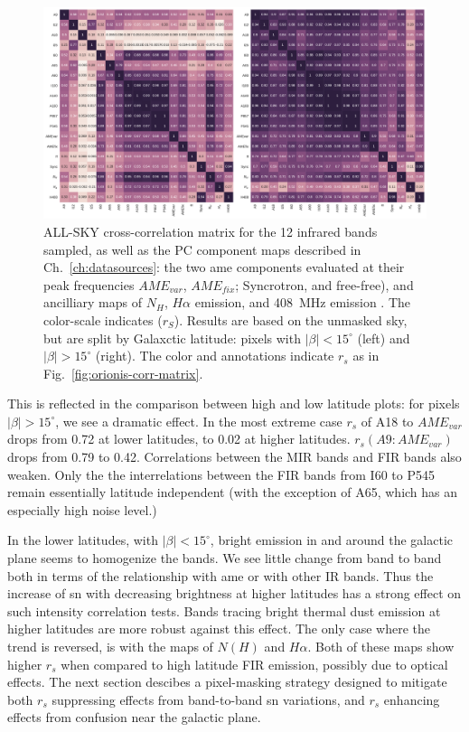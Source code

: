           \begin{figure}
            \includegraphics[width=\textwidth]{../Plots/ch_allsky/all_bands_corr_matrix_wAME_spearmanintensity_unmasked.pdf}
            \centering
            \caption{ALL-SKY cross-correlation matrix for the 12 infrared bands sampled, as well as the PC component maps described in Ch.~\ref{ch:datasources}: the two \acrshort{ame} components evaluated at their peak frequencies $AME_{var}$, $AME_{fix}$; Syncrotron, and free-free), and ancilliary maps of $N_{H}$, $H{\alpha}$ emission, and 408~MHz emission \cite{haslam82}. The color-scale indicates ($r_{S}$). Results are based on the unmasked sky, but are split by Galaxctic latitude: pixels with $|\beta{}| < 15^{\circ}$ (left) and $|\beta{}| > 15^{\circ}$ (right). The color and annotations indicate $r_{s}$ as in Fig.~\ref{fig:orionis-corr-matrix}. }
            \label{fig:all_bands_corr_matrix_wAME_spearman}
          \end{figure}
       This is reflected in the comparison between high and low latitude plots: for pixels $|\beta| > 15 ^{\circ}$, we see a dramatic effect. In the most extreme case $r_{s}$ of A18 to $AME_{var}$ drops from 0.72 at lower latitudes, to 0.02 at higher latitudes. $r_{s}(A9:AME_{var})$ drops from 0.79 to 0.42. Correlations between the MIR bands and FIR bands also weaken. Only the the interrelations between the FIR bands from I60 to P545 remain essentially latitude independent (with the exception of A65, which has an especially high noise level.)

        In the lower latitudes, with $|\beta| < 15^{\circ}$, bright emission in and around the galactic plane seems to homogenize the bands. We see little change from band to band both in terms of the relationship with \acrshort{ame} or with other IR bands. Thus the increase of \acrshort{sn} with decreasing brightness at higher latitudes has a strong effect on such intensity correlation tests. Bands tracing bright thermal dust emission at higher latitudes are more robust against this effect. The only case where the trend is reversed, is with the maps of $N(H)$ and $H{\alpha}$. Both of these maps show higher $r_{s}$ when compared to high latitude FIR emission, possibly due to optical effects. The next section descibes a pixel-masking strategy designed to mitigate both $r_{s}$ suppressing effects from band-to-band \acrshort{sn} variations, and $r_{s}$ enhancing effects from confusion near the galactic plane.

